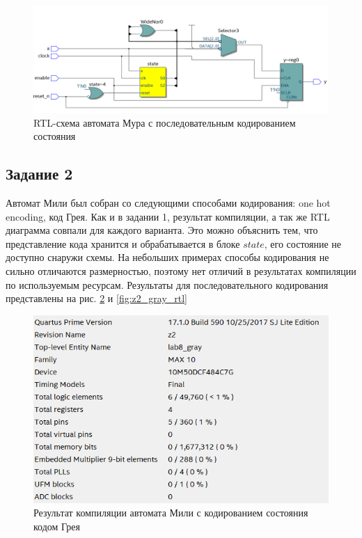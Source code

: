 \documentclass[a4paper,14pt]{article}
\begin{document}
	\begin{figure}[H]
		\centering
		\includegraphics[width=\linewidth]{images/z1_bin_rtl}
		\caption{RTL-схема автомата Мура с последовательным кодированием состояния}
		\label{fig:z1_bin_rtl}
	\end{figure}

	\subsection{Задание 2}
	
	Автомат Мили был собран со следующими способами кодирования: one hot encoding, код Грея.
	Как и в задании 1, результат компиляции, а так же RTL диаграмма совпали для каждого варианта.
	Это можно объяснить тем, что представление кода хранится и обрабатывается в блоке $state$, его состояние не доступно снаружи схемы.
	На небольших примерах способы кодирования не сильно отличаются размерностью, поэтому нет отличий в результатах компиляции по используемым ресурсам.
	Результаты для последовательного кодирования представлены на рис. \ref{fig:z2_gray_report} и \ref{fig:z2_gray_rtl}
	
	\begin{figure}[H]
		\centering
		\includegraphics[width=0.8\linewidth]{images/z2_gray_report}
		\caption{Результат компиляции автомата Мили с кодированием состояния кодом Грея}
		\label{fig:z2_gray_report}
	\end{figure}	
	
\end{document}
